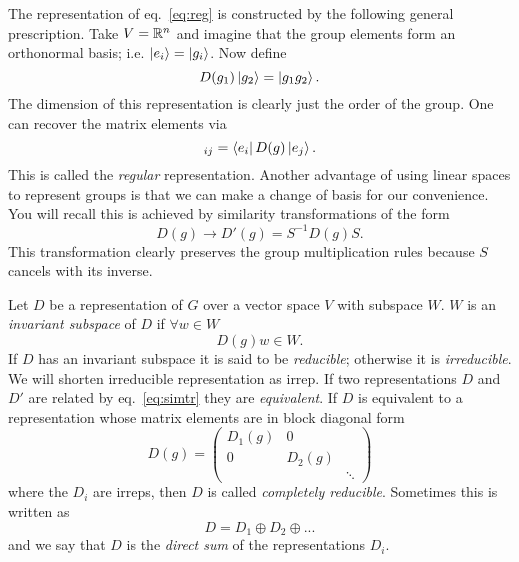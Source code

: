 The representation of eq.~\eqref{eq:reg} is constructed by 
the following general prescription. Take $V=\mathbb{R}^n$ 
and imagine that the group elements form an orthonormal 
basis; i.e. $\ket{e_i}=\ket{g_i}$. Now define
\begin{equation}
  D(g_1)\ket{g_2}=\ket{g_1g_2}.
\end{equation}
The dimension of this representation is clearly just the order
of the group. One can recover the matrix elements via
\begin{equation}
  [D(g)]_{ij}=\bra{e_i}D(g)\ket{e_j}.
\end{equation}
  This is called the {\it regular} 
representation. Another advantage of using linear spaces to represent groups
is that we can make a change of basis for our convenience. You
will recall this is achieved by similarity transformations
of the form
\begin{equation}\label{eq:simtr}
  D(g)\to D'(g)=S^{-1}D(g)S.
\end{equation}
This transformation clearly preserves the group multiplication
rules because $S$ cancels with its inverse.

Let $D$ be a representation of $G$ over a vector space $V$ with
subspace $W$. $W$ is an {\it invariant subspace} 
of $D$ if
$\forall w\in W$
\begin{equation}
  D(g)w\in W.
\end{equation}
If $D$ has an invariant subspace it is said to be {\it reducible};
 otherwise it is {\it irreducible}. 
We will shorten irreducible representation as irrep. If two representations $D$
and $D'$ are related by eq.~\eqref{eq:simtr} they are {\it equivalent}.
If $D$ is equivalent to a representation whose matrix
elements are in block diagonal form
\begin{equation}
  D(g)=\left(\begin{array}{ccc}
             D_1(g) & 0      &       \\
             0      & D_2(g) &       \\
                    &        & \ddots
             \end{array}\right)
\end{equation}
where the $D_i$ are irreps, then $D$ is called {\it completely
reducible}. Sometimes this is written as
\begin{equation}
  D=D_1\oplus D_2\oplus ...
\end{equation}
and we say that $D$ is the {\it direct sum} 
of the representations $D_i$.

